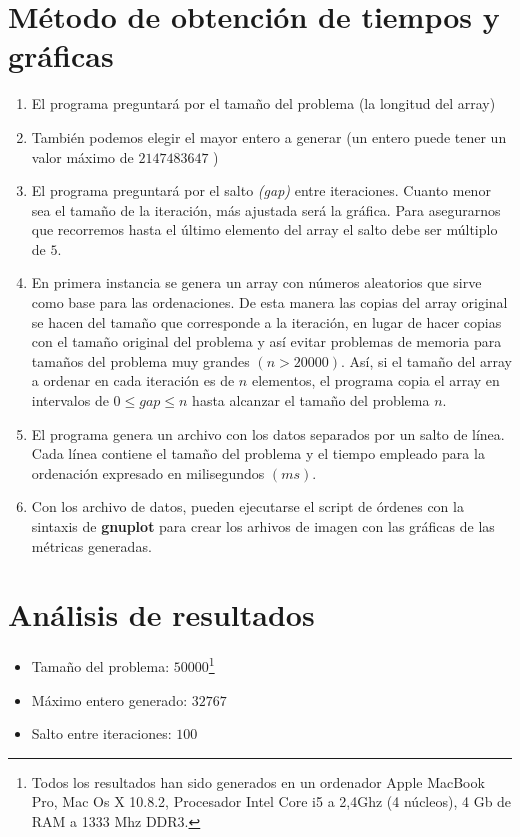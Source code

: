 \section{Método de obtención de tiempos y gráficas}
	\begin{enumerate}
		\item El programa preguntará por el tamaño del problema (la longitud del array)
		\item También podemos elegir el mayor entero a generar (un entero puede tener un valor 				máximo de $2147483647$ )
		\item El programa preguntará por el salto \emph{(gap)} entre iteraciones.  Cuanto menor 					sea el tamaño de la iteración, más ajustada será la gráfica.  Para asegurarnos que 					recorremos hasta el último elemento del array el salto debe ser múltiplo de $5$.
		\item En primera instancia se genera un array con números aleatorios que sirve como base 					para las ordenaciones.  De esta manera las copias del array original se hacen del 					tamaño que corresponde a la iteración, en lugar de hacer copias con el tamaño original 				del problema y así evitar problemas de memoria para tamaños del problema muy grandes 					$(n > 20000)$.  Así, si el tamaño del array a ordenar en cada iteración es de $n$ 					elementos, el programa copia el array en intervalos de $0 \leq gap \leq n$ hasta alcanzar el 				tamaño del problema $n$.
		\item El programa genera un archivo con los datos separados por un salto de línea.  Cada 					línea contiene el tamaño del problema y el tiempo empleado para la ordenación expresado 			en milisegundos $(ms)$.
		\item Con los archivo de datos, pueden ejecutarse el script de órdenes con la sintaxis de 				\textbf{gnuplot} para crear los arhivos de imagen con las gráficas de las métricas 					generadas.
	\end{enumerate}


\section{Análisis de resultados}
\begin{itemize}
\item Tamaño del problema: $50000$\footnote{Todos los resultados han sido generados en un ordenador Apple MacBook Pro, Mac Os X 10.8.2, Procesador Intel Core i5 a 2,4Ghz (4 núcleos), 4 Gb de RAM a 1333 Mhz DDR3.}
\item Máximo entero generado: $32767$
\item Salto entre iteraciones: $100$
\end{itemize}
\newpage
